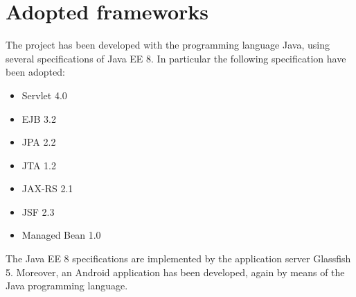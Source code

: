 
\section{Adopted frameworks}

The project has been developed with the programming language Java, using several specifications of Java EE 8.
In particular the following specification have been adopted:

\begin{itemize}
\item Servlet 4.0
\item EJB 3.2
\item JPA 2.2
\item JTA 1.2
\item JAX-RS 2.1
\item JSF 2.3
\item Managed Bean 1.0
\end{itemize}
The Java EE 8 specifications are implemented by the application server Glassfish 5.
Moreover, an Android application has been developed, again by means of the Java programming language.

